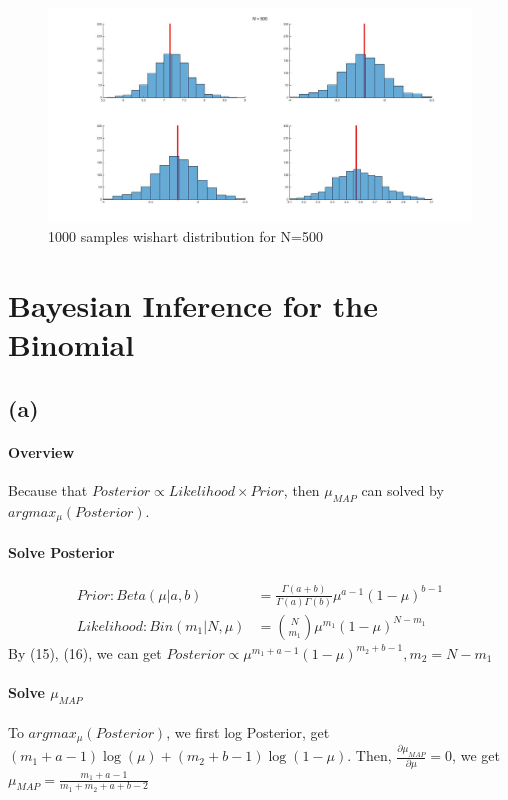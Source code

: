 \documentclass[]{article}
\begin{document}
										\begin{figure}[H]
											\centering
											\includegraphics[width=1.2\linewidth]{2b3}
											\caption{1000 samples wishart distribution for N=500}
											\label{fig:2b3}
										\end{figure}																
						\section{Bayesian Inference for the Binomial}
						\subsection*{(a)}
							\paragraph*{Overview}
								Because that $Posterior \propto Likelihood \times Prior$, then $\mu_{MAP}$ can solved by $argmax_{\mu}(Posterior)$.
								\paragraph*{Solve Posterior}
								\begin{align}
								Prior:Beta(\mu|a, b) &= \frac{\Gamma(a + b)}{\Gamma(a)\Gamma(b)}\mu^{a-1}(1-\mu)^{b-1}\\
								Likelihood:Bin(m_{1}|N,\mu) &= \binom{N}{m_{1}}\mu^{m_{1}}(1-\mu)^{N-m_{1}}
								\end{align}
								By (15), (16), we can get $Posterior \propto \mu^{m_{1}+a-1}(1-\mu)^{m_{2}+b-1}, m_{2} = N - m_{1}$
									\paragraph*{Solve $\mu_{MAP}$}
									To $argmax_{\mu}(Posterior)$, we first log Posterior, 
									get $(m_{1}+a-1)\log(\mu)+(m_{2}+b-1)\log(1-\mu)$.
									Then, $\frac{\partial{\mu_{MAP}}}{\partial{\mu}} = 0$, we get $\mu_{MAP} = \frac{m_{1}+a-1}{m_{1}+m_{2}+a+b-2}$
\end{document}
